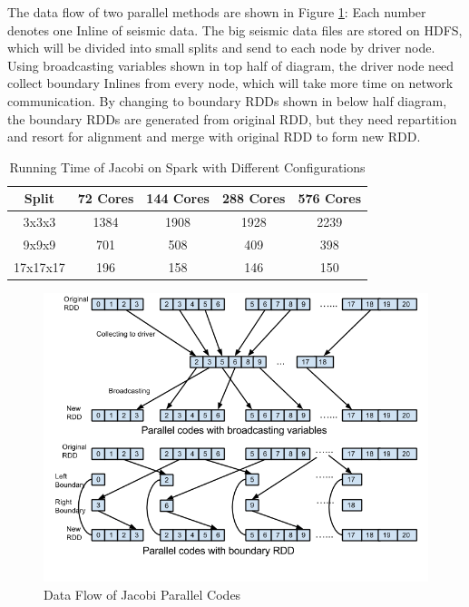 The data flow of two parallel methods are shown in Figure \ref{JacobiCode}: Each number denotes one Inline of seismic data. The big seismic data files are stored on HDFS, which will be divided into small splits and send to each node by driver node. Using broadcasting variables shown in top half of diagram, the driver node need collect boundary Inlines from every node, which will take more time on network communication. By changing to boundary RDDs shown in below half diagram, the boundary RDDs are generated from original RDD, but they need repartition and resort for alignment and merge with original RDD to form new RDD.


\begin{table}[H]
\caption{Running Time of Jacobi on Spark with Different Configurations}
\centering
\begin{tabular}{||c| c c c c ||} 
 \hline
 Split & 72 Cores & 144 Cores & 288 Cores & 576 Cores \\ [0.5ex] 
 \hline
 3x3x3 & 1384 & 1908 & 1928 & 2239 \\ 
 9x9x9 & 701 & 508 & 409 & 398 \\
 17x17x17 & 196 & 158 & 146 & 150 \\
 \hline
\end{tabular}
\label{table:JacobiSpark}
\end{table}

\begin{figure}[H]
\centering
\includegraphics[scale=.6]{figures/JacobiCode.png}
\caption{Data Flow of Jacobi Parallel Codes}
\label{JacobiCode}
\end{figure}

